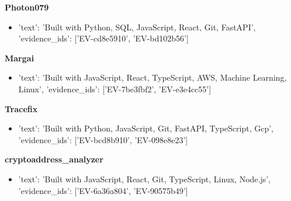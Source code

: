 \documentclass[10pt, letterpaper]{article}
\begin{document}
    \vspace{4pt}

    \textbf{\color{primary} Photon079}  \\
    
    
    \begin{itemize}
    
        \item {'text': 'Built with Python, SQL, JavaScript, React, Git, FastAPI', 'evidence_ids': ['EV-cd8e5910', 'EV-bd102b56']}
    
    \end{itemize}
    
    \vspace{4pt}

    \textbf{\color{primary} Margai}  \\
    
    
    \begin{itemize}
    
        \item {'text': 'Built with JavaScript, React, TypeScript, AWS, Machine Learning, Linux', 'evidence_ids': ['EV-7be3fbf2', 'EV-e3e4cc55']}
    
    \end{itemize}
    
    \vspace{4pt}

    \textbf{\color{primary} Tracefix}  \\
    
    
    \begin{itemize}
    
        \item {'text': 'Built with Python, JavaScript, Git, FastAPI, TypeScript, Gcp', 'evidence_ids': ['EV-bcd8b910', 'EV-098e8e23']}
    
    \end{itemize}
    
    \vspace{4pt}

    \textbf{\color{primary} cryptoaddress\_analyzer}  \\
    
    
    \begin{itemize}
    
        \item {'text': 'Built with JavaScript, React, Git, TypeScript, Linux, Node.js', 'evidence_ids': ['EV-6a36a804', 'EV-90575b49']}
    
    \end{itemize}
    
\end{document}
